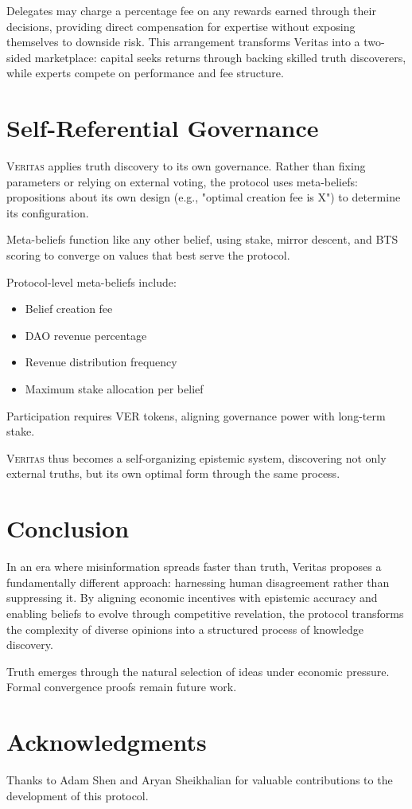 \documentclass[11pt,a4paper]{article}
\newcommand{\veritas}{\textsc{Veritas}}
\begin{document}
Delegates may charge a percentage fee on any rewards earned through their decisions, providing direct compensation for expertise without exposing themselves to downside risk. This arrangement transforms Veritas into a two-sided marketplace: capital seeks returns through backing skilled truth discoverers, while experts compete on performance and fee structure.

\section{Self-Referential Governance}

\veritas{} applies truth discovery to its own governance. Rather than fixing parameters or relying on external voting, the protocol uses meta-beliefs: propositions about its own design (e.g., "optimal creation fee is X") to determine its configuration.

Meta-beliefs function like any other belief, using stake, mirror descent, and BTS scoring to converge on values that best serve the protocol. 

Protocol-level meta-beliefs include:
\begin{itemize}
\item Belief creation fee
\item DAO revenue percentage
\item Revenue distribution frequency
\item Maximum stake allocation per belief
\end{itemize}

Participation requires VER tokens, aligning governance power with long-term stake.

\veritas{} thus becomes a self-organizing epistemic system, discovering not only external truths, but its own optimal form through the same process.

\section{Conclusion}

In an era where misinformation spreads faster than truth, Veritas proposes a fundamentally different approach: harnessing human disagreement rather than suppressing it. By aligning economic incentives with epistemic accuracy and enabling beliefs to evolve through competitive revelation, the protocol transforms the complexity of diverse opinions into a structured process of knowledge discovery.

Truth emerges through the natural selection of ideas under economic pressure. Formal convergence proofs remain future work.

\section*{Acknowledgments}

Thanks to Adam Shen and Aryan Sheikhalian for valuable contributions to the development of this protocol.



\end{document}
